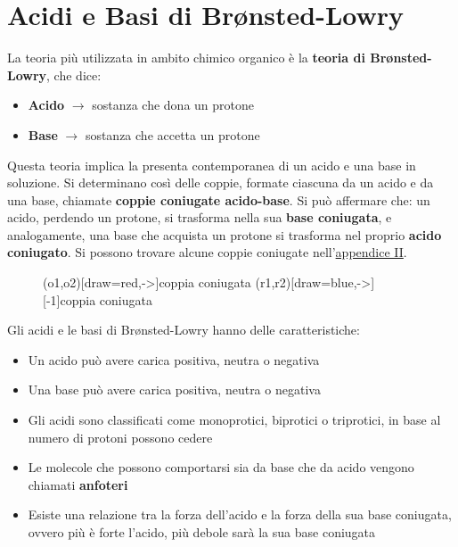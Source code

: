 \section{Acidi e Basi di Br{\o}nsted-Lowry}
\noindent La teoria più utilizzata in ambito chimico organico è la \textbf{teoria di Br{\o}nsted-Lowry}, che dice:
\begin{itemize}
	\item[] \textbf{Acido} \(\rightarrow\) sostanza che dona un protone
	\item[] \textbf{Base} \(\rightarrow\) sostanza che accetta un protone
\end{itemize}

Questa teoria implica la presenta contemporanea di un acido e una base in soluzione. Si determinano così delle coppie, formate ciascuna da un acido e da una base, chiamate \textbf{coppie coniugate acido-base}. Si può affermare che: un acido, perdendo un protone, si trasforma nella sua \textbf{base coniugata}, e analogamente, una base che acquista un protone si trasforma nel proprio \textbf{acido coniugato}. Si possono trovare alcune coppie coniugate nell'\hyperref[ap:acidi.basi]{appendice II}.

\begin{figure}[H]
	\centering
	\vspace{7mm}
	\redox(o1,o2)[draw=red,->]{\small \color{red}coppia coniugata}
	\redox(r1,r2)[draw=blue,->][-1]{\small \color{blue}coppia coniugata}
	\vspace{7mm}
\end{figure}

\noindent Gli acidi e le basi di Br{\o}nsted-Lowry hanno delle caratteristiche:
\begin{itemize}
	\item Un acido può avere carica positiva, neutra o negativa
	\item Una base può avere carica positiva, neutra o negativa
	\item Gli acidi sono classificati come monoprotici, biprotici o triprotici, in base al numero di protoni possono cedere
	\item Le molecole che possono comportarsi sia da base che da acido vengono chiamati \textbf{anfoteri}
	\item Esiste una relazione tra la forza dell'acido e la forza della sua base coniugata, ovvero più è forte l'acido, più debole sarà la sua base coniugata
\end{itemize}


